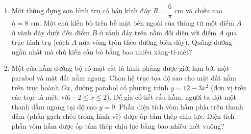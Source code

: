 \documentclass[12pt,a4paper]{article}
\begin{document}
\begin{enumerate}[label=\textbf{Câu \arabic*:}, leftmargin=*]

\item Một thùng đựng sơn hình trụ có bán kính đáy $R = \dfrac{6}{\pi}\text{ cm}$ và chiều cao $h = 8\text{ cm}$. Một chú kiến bò trên bề mặt bên ngoài của thùng từ một điểm $A$ ở vành đáy dưới đến điểm $B$ ở vành đáy trên nằm đối diện với điểm $A$ qua trục hình trụ (cách $A$ nửa vòng tròn theo đường biên đáy). Quãng đường ngắn nhất mà chú kiến cần bò bằng bao nhiêu xăng-ti-mét?

\item \begin{minipage}[t]{0.55\linewidth}
Một cửa hầm đường bộ có mặt cắt là hình phẳng được giới hạn bởi một parabol và mặt đất nằm ngang. Chọn hệ trục tọa độ sao cho mặt đất nằm trên trục hoành $Ox$, đường parabol có phương trình $y = 12 - 3x^2$ (đơn vị trên các trục là mét, với $-2 \le x \le 2$). Để gia cố kết cấu hầm, người ta đặt một thanh dầm ngang tại độ cao $y = 9$. Phần diện tích vòm hầm phía trên thanh dầm (phần gạch chéo trong hình vẽ) được ốp tấm thép chịu lực. Diện tích phần vòm hầm được ốp tấm thép chịu lực bằng bao nhiêu mét vuông?
\end{minipage}\hfill
\begin{minipage}[t]{0.42\linewidth}
\vspace{-0.4\baselineskip}
\centering
{}
\end{minipage}


\end{enumerate}
\end{document}
